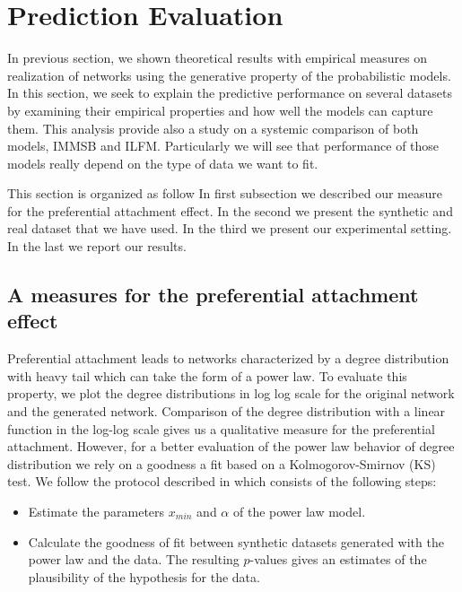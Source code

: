 \section{Prediction Evaluation}
\label{sec:experiments}

In previous section, we shown theoretical results with empirical measures  on realization of networks using the generative property of the probabilistic models. In this section, we seek to explain the predictive performance on several datasets by examining their empirical properties and how well the models can capture them. This analysis provide also a study on a systemic comparison of both models, IMMSB and ILFM. Particularly we will see that performance of those models really depend on the type of data we want to fit.

This section is organized as follow In first subsection we described our measure for the preferential attachment effect. In the second we present the synthetic and real dataset that we have used. In the third we present our experimental setting. In the last we report our results.

\subsection{A measures for the preferential attachment effect}

\label{sec:experiments-busrt}
Preferential attachment leads to networks characterized by a degree distribution with heavy tail which can take the form of a power law. To evaluate this property,  we  plot the degree distributions in log log scale for the original network and the generated network. Comparison of the degree distribution with a linear function in the log-log scale  gives us a qualitative measure for the preferential attachment. However, for a better evaluation of the power law behavior of degree distribution we rely on a  goodness a fit based on a Kolmogorov-Smirnov (KS) test. We follow the protocol described in \cite{clauset2009power} which consists of the following steps:
\begin{itemize}
	\item Estimate the parameters $x_{min}$ and $\alpha$ of the power law model.
	\item Calculate the goodness of fit between synthetic datasets generated with the power law and the data. The resulting $p$-values gives an estimates of the          plausibility of the hypothesis for the data.
\end{itemize}

